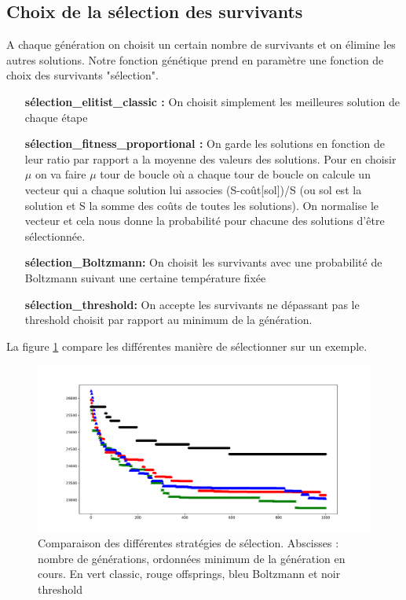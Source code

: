 \documentclass[10pt,a4paper]{article}
\begin{document}
\subsection{Choix de la sélection des survivants}

A chaque génération on choisit un certain nombre de survivants et on élimine les autres solutions. Notre fonction génétique prend en paramètre une fonction de choix des survivants "sélection". 
\begin{itemize}
\item[\textbf{sélection\_elitist\_classic : }] On choisit simplement les meilleures solution de chaque étape
\item[\textbf{sélection\_fitness\_proportional : }] On garde les solutions en fonction de leur ratio par rapport a la moyenne des valeurs des solutions. Pour en choisir $\mu$ on va faire $\mu$ tour de boucle où a chaque tour de boucle on calcule un vecteur qui a chaque solution lui associes (S-coût[sol])/S (ou sol est la solution et S la somme des coûts de toutes les solutions). On normalise le vecteur et cela nous donne la probabilité pour chacune des solutions d'être sélectionnée. 
\item[\textbf{sélection\_Boltzmann: }] On choisit les survivants avec une probabilité de Boltzmann suivant une certaine température fixée
\item[\textbf{sélection\_threshold: }] On accepte les survivants ne dépassant pas le threshold choisit par rapport au minimum de la génération.
\end{itemize}

La figure \ref{compareselection} compare les différentes manière de sélectionner sur un exemple. 

\begin{figure}
\centering
\includegraphics[scale=.4]{images/comparaison_genetic_selection.pdf}
\caption{Comparaison des différentes stratégies de sélection. Abscisses : nombre de générations, ordonnées minimum de la génération en cours. 
En vert classic, rouge offsprings, bleu Boltzmann et noir threshold}
\label{compareselection}
\end{figure}
\end{document}
